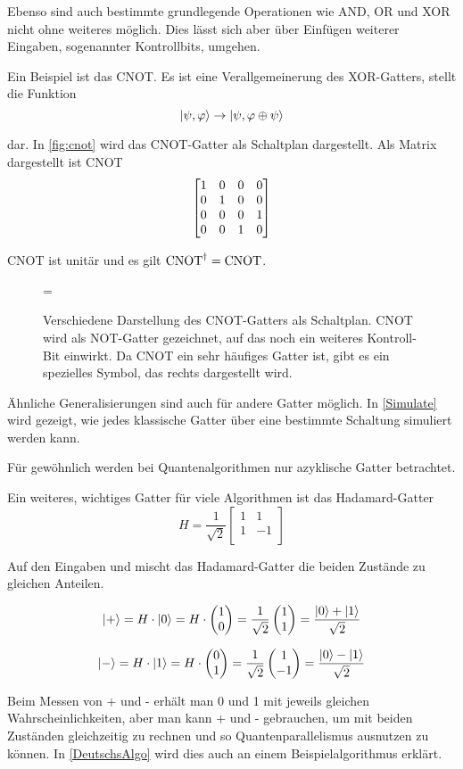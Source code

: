 \documentclass{acm_proc_article-sp}
\begin{document}
Ebenso sind auch bestimmte grundlegende Operationen wie AND, OR und XOR nicht ohne weiteres möglich. 
Dies lässt sich aber über Einfügen weiterer Eingaben, sogenannter Kontrollbits, umgehen.

Ein Beispiel ist das CNOT. Es ist eine Verallgemeinerung des XOR-Gatters, stellt die Funktion
\[
    \left|\psi, \varphi\right\rangle \rightarrow \left|\psi, \varphi \oplus \psi\right\rangle
\]

dar. In \autoref{fig:cnot} wird das CNOT-Gatter als Schaltplan dargestellt.
Als Matrix dargestellt ist CNOT
\[
    \begin{bmatrix} 1 & 0 & 0 & 0 \\ 0 & 1 & 0 & 0 \\ 0 & 0 & 0 & 1 \\ 0 & 0 & 1 & 0 \\ \end{bmatrix}
\]

CNOT ist unitär und es gilt $\operatorname{CNOT}^\dagger = \operatorname{CNOT}$.

\begin{figure}
  \centerline{
    \pictureCNOTa
    \hbox{=}
    \pictureCNOTb
  }
  \caption{
      Verschiedene Darstellung des CNOT-Gatters als Schaltplan. CNOT wird als NOT-Gatter gezeichnet, auf das
      noch ein weiteres Kontroll-Bit einwirkt. Da CNOT ein sehr häufiges Gatter ist, gibt es ein
      spezielles Symbol, das rechts dargestellt wird.
  }
  \label{fig:cnot}
\end{figure}

Ähnliche Generalisierungen sind auch für andere Gatter möglich. In \autoref{Simulate} wird gezeigt, wie jedes
klassische Gatter über eine bestimmte Schaltung simuliert werden kann.

Für gewöhnlich werden bei Quantenalgorithmen nur azyklische Gatter betrachtet.

Ein weiteres, wichtiges Gatter für viele Algorithmen ist das Hadamard-Gatter
\[
    H = \frac{1}{\sqrt 2}
    \begin{bmatrix}
        1 & 1 \\
        1 & -1 \\
    \end{bmatrix}
\]

\begin{center}
    \pictureHadamard
\end{center}

Auf den Eingaben  und  mischt das Hadamard-Gatter die beiden
Zustände zu gleichen Anteilen.

\[
 \left|+\right\rangle = H \cdot \left|0\right\rangle = H \cdot \begin{pmatrix} 1 \\ 0 \end{pmatrix} = \frac{1}{\sqrt 2} \begin{pmatrix} 1 \\ 1 \end{pmatrix} = \frac{\left|0\right\rangle + \left|1\right\rangle}{\sqrt 2} 
\]

\[
 \left|-\right\rangle = H \cdot \left|1\right\rangle = H \cdot \begin{pmatrix} 0 \\ 1 \end{pmatrix} = \frac{1}{\sqrt 2} \begin{pmatrix} 1 \\ -1 \end{pmatrix} = \frac{\left|0\right\rangle - \left|1\right\rangle}{\sqrt 2} 
\]

Beim Messen von \qreg + und \qreg -  erhält man 0 und 1 mit jeweils gleichen Wahrscheinlichkeiten, aber
man kann \qreg + und \qreg - gebrauchen, um mit beiden Zuständen gleichzeitig
zu rechnen und so Quantenparallelismus ausnutzen zu können.
In \autoref{DeutschsAlgo} wird dies auch an einem Beispielalgorithmus erklärt.
\end{document}
